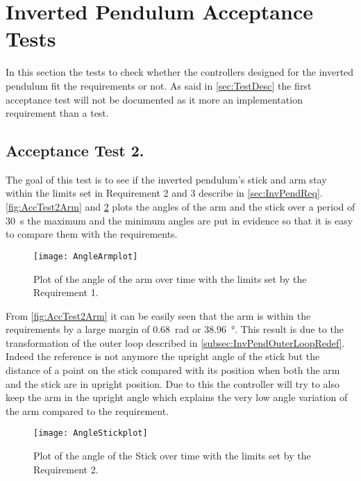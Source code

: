 \graphicspath{{figures/AcceptanceTest/}}

\section{Inverted Pendulum Acceptance Tests}\label{sec:InvPendAccTest}

In this section the tests to check whether the controllers designed for the inverted pendulum fit the requirements or not. As said in \autoref{sec:TestDesc} the first acceptance test will not be documented as it more an implementation requirement than a test.

\subsection{Acceptance Test 2.}

The goal of this test is to see if the inverted pendulum's stick and arm stay within the limits set in Requirement 2 and 3 describe in \autoref{sec:InvPendReq}. \autoref{fig:AccTest2Arm} and \ref{fig:AccTest2Stick} plots the angles of the arm and the stick over a period of \SI{30}{\second} the maximum and the minimum angles are put in evidence so that it is easy to compare them with the requirements.

\begin{figure} [htbp]
	\centering
	\texttt{[image: AngleArmplot]}
	\caption{Plot of the angle of the arm over time with the limits set by the Requirement 1.}
	\label{fig:AccTest2Arm}
\end{figure}

From \autoref{fig:AccTest2Arm} it can be easily seen that the arm is within the requirements by a large margin of \SI{0.68}{\radian} or \SI{38.96}{\degree}. This result is due to the transformation of the outer loop described in \autoref{subsec:InvPendOuterLoopRedef}. Indeed the reference is not anymore the upright angle of the stick but the distance of a point on the stick compared with its position when both the arm and the stick are in upright position. Due to this the controller will try to also keep the arm in the upright angle which explains the very low angle variation of the arm compared to the requirement.

\begin{figure} [htbp]
	\centering
	\texttt{[image: AngleStickplot]}
	\caption{Plot of the angle of the Stick over time with the limits set by the Requirement 2.}
	\label{fig:AccTest2Stick}
\end{figure}

